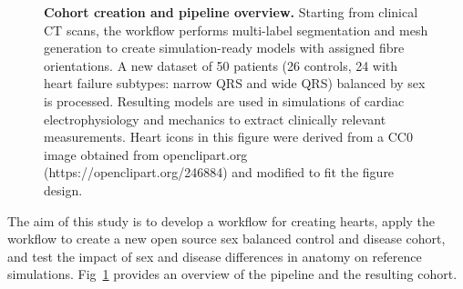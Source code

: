 \begin{figure}[hbpt]
    \caption{
        \textbf{Cohort creation and pipeline overview. }
        Starting from clinical CT scans, the workflow performs multi-label segmentation and mesh generation 
        to create simulation-ready models with assigned fibre orientations. 
        A new dataset of 50 patients (26 controls, 24 with heart failure subtypes: narrow QRS and wide QRS) 
        balanced by sex is processed. 
        Resulting models are used in simulations of cardiac electrophysiology and mechanics to extract
        clinically relevant measurements.
        Heart icons in this figure were derived from a CC0 image obtained from openclipart.org (https://openclipart.org/246884) and modified to fit the figure design.
    }
    \label{fig:heartbuilder_pipeline}
\end{figure}


The aim of this study is to develop a workflow for creating hearts, 
apply the workflow to create a new open source sex balanced control and disease cohort, 
and test the impact of sex and disease differences in anatomy on reference simulations. 
Fig~\ref{fig:heartbuilder_pipeline} provides an overview of the pipeline and the resulting cohort.

